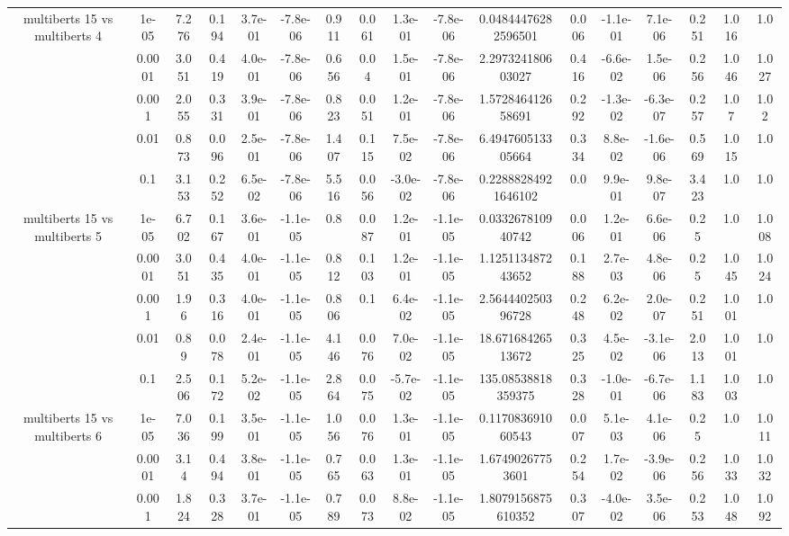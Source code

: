 \begin{tabular}{|c|c|c|c|c|c|c|c|c|c|c|c|c|c|c|c|c|}
\hline
\multirow{5}{*}{multiberts 15 vs multiberts 4} & 1e-05 & 7.276 & 0.194 & 3.7e-01 & -7.8e-06 & 0.911 & 0.061 & 1.3e-01 & -7.8e-06 & 0.04844476282596501 & 0.006 & -1.1e-01 & 7.1e-06 & 0.251 & 1.016 & 1.0 \\
 & 0.0001 & 3.051 & 0.419 & 4.0e-01 & -7.8e-06 & 0.656 & 0.04 & 1.5e-01 & -7.8e-06 & 2.297324180603027 & 0.416 & -6.6e-02 & 1.5e-06 & 0.256 & 1.046 & 1.027 \\
 & 0.001 & 2.055 & 0.331 & 3.9e-01 & -7.8e-06 & 0.823 & 0.051 & 1.2e-01 & -7.8e-06 & 1.572846412658691 & 0.292 & -1.3e-02 & -6.3e-07 & 0.257 & 1.07 & 1.02 \\
 & 0.01 & 0.873 & 0.096 & 2.5e-01 & -7.8e-06 & 1.407 & 0.115 & 7.5e-02 & -7.8e-06 & 6.494760513305664 & 0.334 & 8.8e-02 & -1.6e-06 & 0.569 & 1.015 & 1.0 \\
 & 0.1 & 3.153 & 0.252 & 6.5e-02 & -7.8e-06 & 5.516 & 0.056 & -3.0e-02 & -7.8e-06 & 0.22888284921646102 & 0.0 & 9.9e-01 & 9.8e-07 & 3.423 & 1.0 & 1.0 \\
\hline
\multirow{5}{*}{multiberts 15 vs multiberts 5} & 1e-05 & 6.702 & 0.167 & 3.6e-01 & -1.1e-05 & 0.8 & 0.087 & 1.2e-01 & -1.1e-05 & 0.033267810940742 & 0.006 & 1.2e-01 & 6.6e-06 & 0.25 & 1.0 & 1.008 \\
 & 0.0001 & 3.051 & 0.435 & 4.0e-01 & -1.1e-05 & 0.812 & 0.103 & 1.2e-01 & -1.1e-05 & 1.125113487243652 & 0.188 & 2.7e-03 & 4.8e-06 & 0.25 & 1.045 & 1.024 \\
 & 0.001 & 1.96 & 0.316 & 4.0e-01 & -1.1e-05 & 0.806 & 0.1 & 6.4e-02 & -1.1e-05 & 2.564440250396728 & 0.248 & 6.2e-02 & 2.0e-07 & 0.251 & 1.001 & 1.0 \\
 & 0.01 & 0.89 & 0.078 & 2.4e-01 & -1.1e-05 & 4.146 & 0.076 & 7.0e-02 & -1.1e-05 & 18.67168426513672 & 0.325 & 4.5e-02 & -3.1e-06 & 2.013 & 1.001 & 1.0 \\
 & 0.1 & 2.506 & 0.172 & 5.2e-02 & -1.1e-05 & 2.864 & 0.075 & -5.7e-02 & -1.1e-05 & 135.08538818359375 & 0.328 & -1.0e-01 & -6.7e-06 & 1.183 & 1.003 & 1.0 \\
\hline
\multirow{5}{*}{multiberts 15 vs multiberts 6} & 1e-05 & 7.036 & 0.199 & 3.5e-01 & -1.1e-05 & 1.056 & 0.076 & 1.3e-01 & -1.1e-05 & 0.117083691060543 & 0.007 & 5.1e-03 & 4.1e-06 & 0.25 & 1.0 & 1.011 \\
 & 0.0001 & 3.14 & 0.494 & 3.8e-01 & -1.1e-05 & 0.765 & 0.063 & 1.3e-01 & -1.1e-05 & 1.67490267753601 & 0.254 & 1.7e-02 & -3.9e-06 & 0.256 & 1.033 & 1.032 \\
 & 0.001 & 1.824 & 0.328 & 3.7e-01 & -1.1e-05 & 0.789 & 0.073 & 8.8e-02 & -1.1e-05 & 1.8079156875610352 & 0.307 & -4.0e-02 & 3.5e-06 & 0.253 & 1.048 & 1.092 \\

\end{tabular}
